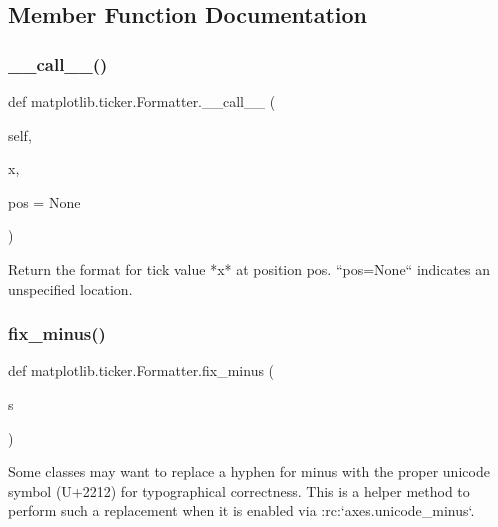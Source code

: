 \subsection{Member Function Documentation}
\mbox{\label{classmatplotlib_1_1ticker_1_1Formatter_a996e93d5f061bf0cf216633f48ca60ed}} 
\subsubsection{\texorpdfstring{\+\_\+\+\_\+call\+\_\+\+\_\+()}{\_\_call\_\_()}}
{\footnotesize\ttfamily def matplotlib.\+ticker.\+Formatter.\+\_\+\+\_\+call\+\_\+\+\_\+ (\begin{DoxyParamCaption}\item[{}]{self,  }\item[{}]{x,  }\item[{}]{pos = {\ttfamily None} }\end{DoxyParamCaption})}

\begin{DoxyVerb}Return the format for tick value *x* at position pos.
``pos=None`` indicates an unspecified location.
\end{DoxyVerb}
 \mbox{\label{classmatplotlib_1_1ticker_1_1Formatter_a88b831b98e4a91369979be4d11095073}} 
\subsubsection{\texorpdfstring{fix\+\_\+minus()}{fix\_minus()}}
{\footnotesize\ttfamily def matplotlib.\+ticker.\+Formatter.\+fix\+\_\+minus (\begin{DoxyParamCaption}\item[{}]{s }\end{DoxyParamCaption})\hspace{0.3cm}{\ttfamily [static]}}

\begin{DoxyVerb}Some classes may want to replace a hyphen for minus with the proper
unicode symbol (U+2212) for typographical correctness.  This is a
helper method to perform such a replacement when it is enabled via
:rc:`axes.unicode_minus`.
\end{DoxyVerb}
 \mbox{\label{classmatplotlib_1_1ticker_1_1Formatter_a5a8ff9f1b254c8fc48aa6b2296394f0c}} 
